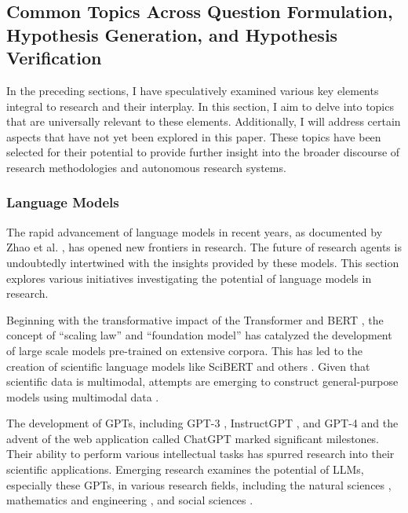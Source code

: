 \subsection{Common Topics Across Question Formulation, Hypothesis Generation, and Hypothesis Verification}
In the preceding sections, I have speculatively examined various key elements integral to research and their interplay. In this section, I aim to delve into topics that are universally relevant to these elements. Additionally, I will address certain aspects that have not yet been explored in this paper. These topics have been selected for their potential to provide further insight into the broader discourse of research methodologies and autonomous research systems. 

\subsubsection{Language Models}
The rapid advancement of language models in recent years, as documented by Zhao et al. \cite{zhao2023survey}, has opened new frontiers in research. The future of research agents is undoubtedly intertwined with the insights provided by these models. This section explores various initiatives investigating the potential of language models in research.

Beginning with the transformative impact of the Transformer \cite{vaswani2017attention} and BERT \cite{devlin2018bert}, the concept of ``scaling law'' \cite{kaplan2020scaling} and ``foundation model'' \cite{bommasani2021opportunities} has catalyzed the development of large scale models pre-trained on extensive corpora. This has led to the creation of scientific language models like SciBERT \cite{beltagy2019scibert} and others \cite{cohan2020specter,singh2022scirepeval,nadkarni2021scientific,gupta2022matscibert,taylor2022galactica,azerbayev2023llemma,xie2023darwin,luo2022biogpt,yang2022gatortron,deng2023learning}. Given that scientific data is multimodal, attempts are emerging to construct general-purpose models using multimodal data \cite{li2023llava,tu2023towards,takeda2023foundation,nguyen2023climax}.

The development of GPTs, including GPT-3 \cite{brown2020language}, InstructGPT \cite{ouyang2022training}, and GPT-4 \cite{GPT4} and the advent of the web application called ChatGPT  \cite{ChatGPT} marked significant milestones. Their ability to perform various intellectual tasks has spurred research into their scientific applications. Emerging research examines the potential of LLMs, especially these GPTs, in various research fields, including the natural sciences \cite{ai4science2023impact,boiko2023emergent,qin2023gpt,bran2023chemcrow,white2022large,hatakeyama2023prompt,jablonka202314,guo2023can,zheng2023large,qian2023can,wysocka2023large,nori2023capabilities,wang2023large,singhal2023large}, mathematics and engineering \cite{bordt2023chatgpt,wu2023empirical,pursnani2023performance,zheng2023can,zhang2023automl,vijay2023prompt}, and social sciences \cite{koneru2023can,wang2023survey,bail2023can,ziems2023can,park2023generative,horton2023large,korinek2023generative,aher2023using}.

